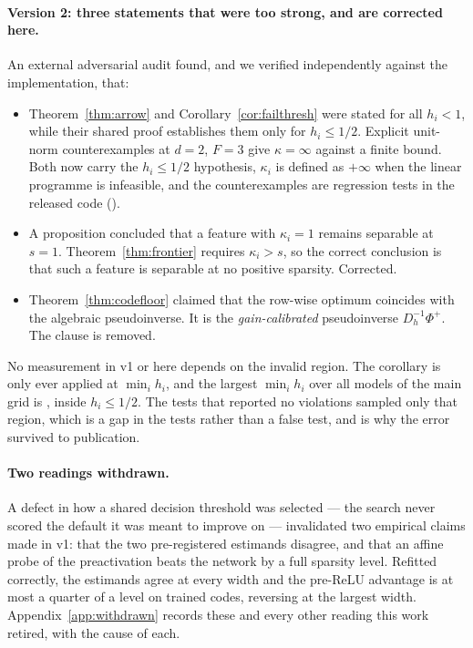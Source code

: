 \paragraph{Version 2: three statements that were too strong, and are corrected here.} An external adversarial
audit found, and we verified independently against the implementation, that:

\begin{itemize}[leftmargin=*,itemsep=3pt]

\item Theorem~\ref{thm:arrow} and Corollary~\ref{cor:failthresh} were stated for all $h_i<1$, while
their shared proof establishes them only for $h_i\le 1/2$. Explicit unit-norm counterexamples at
$d=2$, $F=3$ give $\kappa=\infty$ against a finite bound. Both now carry the $h_i\le 1/2$
hypothesis, $\kappa_i$ is defined as $+\infty$ when the linear programme is infeasible, and the
counterexamples are regression tests in the released code
().

\item A proposition concluded that a feature with $\kappa_i=1$ remains separable at $s=1$.
Theorem~\ref{thm:frontier} requires $\kappa_i>s$, so the correct conclusion is that such a feature is
separable at no positive sparsity. Corrected.

\item Theorem~\ref{thm:codefloor} claimed that the row-wise optimum coincides with the algebraic
pseudoinverse. It is the \emph{gain-calibrated} pseudoinverse $D_h^{-1}\Phi^{+}$. The clause is
removed.

\end{itemize}

No measurement in v1 or here depends on the invalid region. The corollary is only ever applied at
$\min_i h_i$, and the largest $\min_i h_i$ over all \KdThreeModels{} models of the main grid is
\KdThreeMaxLevMin, inside $h_i\le 1/2$. The tests that reported no violations sampled only that
region, which is a gap in the tests rather than a false test, and is why the error survived to
publication.

\paragraph{Two readings withdrawn.} A defect in how a shared decision threshold was selected --- the
search never scored the default it was meant to improve on --- invalidated two empirical claims made
in v1: that the two pre-registered estimands disagree, and that an affine probe of the preactivation
beats the network by a full sparsity level. Refitted correctly, the estimands agree at every width
and the pre-ReLU advantage is at most a quarter of a level on trained codes, reversing at the largest
width. Appendix~\ref{app:withdrawn} records these and every other reading this work retired, with the
cause of each.

